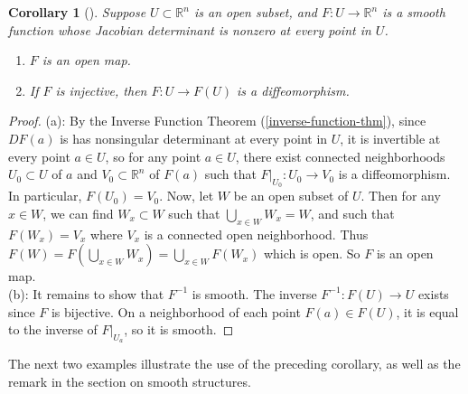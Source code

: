 \documentclass[reqno]{amsart}
\theoremstyle{plain}%
\newtheorem{corollary}[theorem]{Corollary}
\theoremstyle{definition}
\theoremstyle{remark}
\begin{document}
        \begin{corollary}[]\label{corollary-inverse-function-thm}
        Suppose $U \subset \mathbb{R}^{n}$ is an open subset, and
        $F  \colon U \to \mathbb{R}^{n}$ is a smooth function whose Jacobian
        determinant is nonzero at every point in $U$.
        \begin{enumerate}
            \item $F$ is an open map.
            \item If $F$ is injective, then $F  \colon U \to F(U)$ is
                a diffeomorphism.
        \end{enumerate}
        \end{corollary}

        \begin{proof}
        (a): By the Inverse Function Theorem (\ref{inverse-function-thm}), 
        since $DF(a)$ is has nonsingular determinant at every point in $U$, it is
        invertible at every point $a \in U$, so for any point $a \in U$, there
        exist connected neighborhoods $U_0 \subset U$ of $a$ and
        $V_0 \subset \mathbb{R}^{n}$ of $F(a)$ such that
        $F|_{U_0}  \colon U_0 \to V_0$ is a diffeomorphism.
        In particular, $F\left( U_0 \right) = V_0$. Now,
        let $W$ be an open subset of $U$. Then for any
        $x \in W$, we can find $W_x \subset W$ such that
        $\bigcup_{x \in W} W_x = W$, and such that
        $F(W_x) = V_x$ where $V_x$ is a connected open neighborhood.
        Thus  $F(W) = F\left( \bigcup_{x \in W} W_x \right) 
        = \bigcup_{x \in W} F(W_x)$ which is open. So $F$ is an open map.\\
        \linebreak
        (b): It remains to show that $F^{-1}$ is smooth. The inverse
        $F ^{-1}  \colon F(U) \to U$ exists since $F$ is bijective. On
        a neighborhood of each point $F(a) \in F(U)$, it is equal to the inverse of
        $F|_{U_a}$, so it is smooth.
        \end{proof}

        The next two examples illustrate the use of the preceding corollary, as well
        as the remark in the section on smooth structures.
\end{document}
